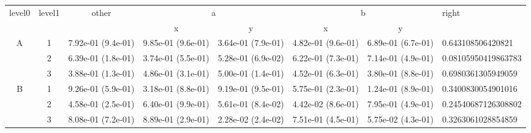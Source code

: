 \begin{tabular}{cccccccl}
\toprule
\multirow{2}{*}{level0} & \multirow{2}{*}{level1}& \multirow{2}{*}{other}&\multicolumn{2}{c}{a}&\multicolumn{2}{c}{b}& \multirow{2}{*}{right}\tabularnewline
\cmidrule(lr){4-5}
\cmidrule(lr){6-7}
&&&x&y&x&y\tabularnewline
\midrule
\multirow{3}{*}{A}&1& 7.92e-01 (9.4e-01)& 9.85e-01 (9.6e-01)& 3.64e-01 (7.9e-01)& 4.82e-01 (9.6e-01)& 6.89e-01 (6.7e-01)& 0.643108506420821\tabularnewline
&2& 6.39e-01 (1.8e-01)& 3.74e-01 (5.5e-01)& 5.28e-01 (6.9e-02)& 6.22e-01 (7.3e-01)& 7.14e-01 (4.9e-01)& 0.08105950419863783\tabularnewline
&3& 3.88e-01 (1.3e-01)& 4.86e-01 (3.1e-01)& 5.00e-01 (1.4e-01)& 4.52e-01 (6.3e-01)& 3.80e-01 (8.8e-01)& 0.6980361305949059\tabularnewline
\midrule
\multirow{3}{*}{B}&1& 9.26e-01 (5.9e-01)& 3.18e-01 (8.8e-01)& 9.19e-01 (9.5e-01)& 5.75e-01 (2.3e-01)& 1.24e-01 (8.9e-01)& 0.3400830054901016\tabularnewline
&2& 4.58e-01 (2.5e-01)& 6.40e-01 (9.9e-01)& 5.61e-01 (8.4e-02)& 4.42e-02 (8.6e-01)& 7.95e-01 (4.9e-01)& 0.24540687126308802\tabularnewline
&3& 8.08e-01 (7.2e-01)& 8.89e-01 (2.9e-01)& 2.28e-02 (2.4e-02)& 7.51e-01 (4.5e-01)& 5.75e-02 (4.3e-01)& 0.3263061028854859\tabularnewline
\bottomrule
\end{tabular}
